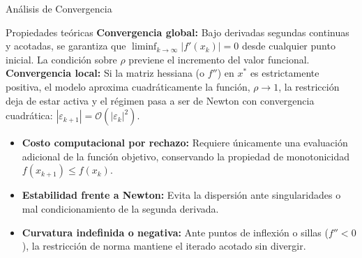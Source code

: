 \begin{frame}{Análisis de Convergencia}
    \begin{alertblock}{Propiedades teóricas}
        \footnotesize
        \textbf{Convergencia global:} Bajo derivadas segundas continuas y acotadas, se garantiza que \(\liminf_{k\to\infty}|f'(x_k)| = 0\) desde cualquier punto inicial. La condición sobre \(\rho\) previene el incremento del valor funcional.
        \\[0.35em]
        \textbf{Convergencia local:} Si la matriz hessiana (o \(f''\)) en \(x^{*}\) es estrictamente positiva, el modelo aproxima cuadráticamente la función, \(\rho \to 1\), la restricción deja de estar activa y el régimen pasa a ser de Newton con convergencia cuadrática: \(|\varepsilon_{k+1}| = \mathcal{O}(|\varepsilon_k|^{2})\).
    \end{alertblock}

    \vspace{0.3em}
    \footnotesize
    \begin{itemize}
        \item \textbf{Costo computacional por rechazo:} Requiere únicamente una evaluación adicional de la función objetivo, conservando la propiedad de monotonicidad \(f(x_{k+1}) \le f(x_k)\).
        \item \textbf{Estabilidad frente a Newton:} Evita la dispersión ante singularidades o mal condicionamiento de la segunda derivada.
        \item \textbf{Curvatura indefinida o negativa:} Ante puntos de inflexión o sillas (\(f'' < 0\)), la restricción de norma mantiene el iterado acotado sin divergir.
    \end{itemize}
\end{frame}